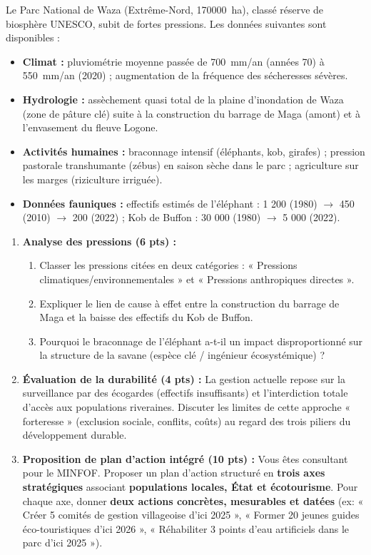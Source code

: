 \documentclass[11pt]{article}
\begin{document}
\begin{exercice}
Le Parc National de Waza (Extrême-Nord, \SI{170 000}{ha}), classé réserve de biosphère UNESCO, subit de fortes pressions. Les données suivantes sont disponibles :
\begin{itemize}
\item \textbf{Climat :} pluviométrie moyenne passée de \SI{700}{mm/an} (années 70) à \SI{550}{mm/an} (2020) ; augmentation de la fréquence des sécheresses sévères.
\item \textbf{Hydrologie :} assèchement quasi total de la plaine d'inondation de Waza (zone de pâture clé) suite à la construction du barrage de Maga (amont) et à l'envasement du fleuve Logone.
\item \textbf{Activités humaines :} braconnage intensif (éléphants, kob, girafes) ; pression pastorale transhumante (zébus) en saison sèche dans le parc ; agriculture sur les marges (riziculture irriguée).
\item \textbf{Données fauniques :} effectifs estimés de l'éléphant : 1 200 (1980) $\to$ 450 (2010) $\to$ 200 (2022) ; Kob de Buffon : 30 000 (1980) $\to$ 5 000 (2022).
\end{itemize}

\begin{enumerate}
\item \textbf{Analyse des pressions (6 pts) :}
\begin{enumerate}
\item Classer les pressions citées en deux catégories : « Pressions climatiques/environnementales » et « Pressions anthropiques directes ».
\item Expliquer le lien de cause à effet entre la construction du barrage de Maga et la baisse des effectifs du Kob de Buffon.
\item Pourquoi le braconnage de l'éléphant a-t-il un impact disproportionné sur la structure de la savane (espèce clé / ingénieur écosystémique) ?
\end{enumerate}
\item \textbf{Évaluation de la durabilité (4 pts) :}
La gestion actuelle repose sur la surveillance par des écogardes (effectifs insuffisants) et l'interdiction totale d'accès aux populations riveraines. Discuter les limites de cette approche « forteresse » (exclusion sociale, conflits, coûts) au regard des trois piliers du développement durable.
\item \textbf{Proposition de plan d'action intégré (10 pts) :}
Vous êtes consultant pour le MINFOF. Proposer un plan d'action structuré en \textbf{trois axes stratégiques} associant \textbf{populations locales, État et écotourisme}. Pour chaque axe, donner \textbf{deux actions concrètes, mesurables et datées} (ex: « Créer 5 comités de gestion villageoise d'ici 2025 », « Former 20 jeunes guides éco-touristiques d'ici 2026 », « Réhabiliter 3 points d'eau artificiels dans le parc d'ici 2025 »).
\end{enumerate}
\end{exercice}
\end{document}
